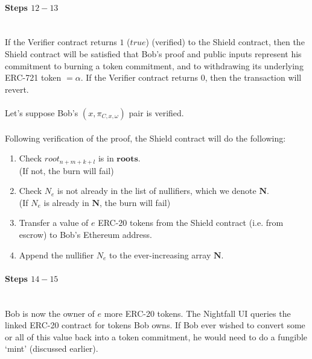 \documentclass{article}
\begin{document}
\paragraph{Steps $12 - 13$}
\ \\
If the Verifier contract returns $1$ ($true$) (verified) to the Shield contract, then the Shield contract will be satisfied that Bob's proof and public inputs represent his commitment to burning a token commitment, and to withdrawing its underlying ERC-721 token $=\alpha$. If the Verifier contract returns $0$, then the transaction will revert.\\
\\
Let's suppose Bob's $(x, \pi_{C,x,\omega})$ pair is verified.\\
\\
Following verification of the proof, the Shield contract will do the following:
\begin{enumerate}
  \item Check $root_{n+m+k+l}$ is in $\bm{roots}$.\\
    (If not, the burn will fail)
  \item Check $N_e$ is not already in the list of nullifiers, which we denote $\bm{N}$.\\
    (If $N_e$ is already in $\bm{N}$, the burn will fail)
  \item Transfer a value of $e$ ERC-20 tokens from the Shield contract (i.e. from escrow) to Bob's Ethereum address.
  \item Append the nullifier $N_e$ to the ever-increasing array $\bm N$.
\end{enumerate}


\paragraph{Steps $14 - 15$}
\ \\
Bob is now the owner of $e$ more ERC-20 tokens. The Nightfall UI queries the linked ERC-20 contract for tokens Bob owns.
If Bob ever wished to convert some or all of this value back into a token commitment, he would need to do a fungible `mint' (discussed earlier).



\newpage


\end{document}
